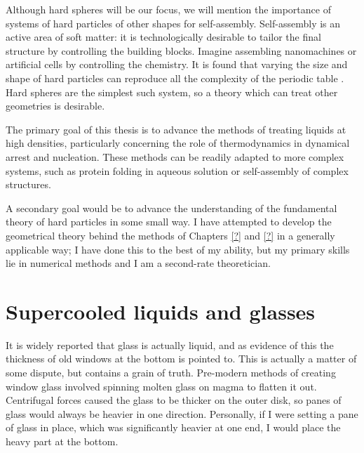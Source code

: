 \documentclass[11pt]{report}
\begin{document}
Although hard spheres will be our focus, we will mention the importance of systems of hard particles of other shapes for self-assembly.
Self-assembly is an active area of soft matter: it is technologically desirable to tailor the final structure by controlling the building blocks.
Imagine assembling nanomachines or artificial cells by controlling the chemistry.
It is found that varying the size and shape of hard particles can reproduce all the complexity of the periodic table \cite{Glotzer?,Dijkstra?}.
Hard spheres are the simplest such system, so a theory which can treat other geometries is desirable.

The primary goal of this thesis is to advance the methods of treating liquids at high densities, particularly concerning the role of thermodynamics in dynamical arrest and nucleation.
These methods can be readily adapted to more complex systems, such as protein folding in aqueous solution or self-assembly of complex structures.

A secondary goal would be to advance the understanding of the fundamental theory of hard particles in some small way.
I have attempted to develop the geometrical theory behind the methods of Chapters \ref{?} and \ref{?} in a generally applicable way;
I have done this to the best of my ability, but my primary skills lie in numerical methods and I am a second-rate theoretician.

\section{Supercooled liquids and glasses}

It is widely reported that glass is actually liquid, and as evidence of this the thickness of old windows at the bottom is pointed to.
This is actually a matter of some dispute, but contains a grain of truth.
Pre-modern methods of creating window glass involved spinning molten glass on magma to flatten it out.
Centrifugal forces caused the glass to be thicker on the outer disk, so panes of glass would always be heavier in one direction.
Personally, if I were setting a pane of glass in place, which was significantly heavier at one end, I would place the heavy part at the bottom.
\end{document}
